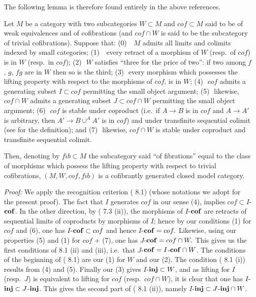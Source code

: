 The following lemma is therefore found
entirely in the above references.
\begin{lemma}
\label{dhklemme}
Let $M$ be a category with two subcategories $W\subset M$ and
$cof\subset M$
said to be of weak equivalences and of cofibrations (and $cof \cap W$
is said to be the
subcategory of trivial cofibrations). Suppose that:
\newline
(0) \,\, $M$ admits all limits and colimits indexed by small
categories;
\newline
(1) \,\, every retract of a morphism of $W$ (resp.\ of $cof$)
is in $W$ (resp.\ in $cof$);
\newline
(2)\,\, $W$ satisfies ``three for the price of two'': if two among $f$, $g$,
$fg$ are in $W$ then so is the third;
\newline
(3)\,\, every morphism which possesses the
lifting property with respect to the morphisms of
$cof$, is in $W$;
\newline
(4)\,\, $cof$ admits a generating subset $I\subset cof$ permitting
the small object argument;
\newline
(5)\,\, likewise, $cof \cap W$ admits a generating subset
$J\subset cof\cap W$
permitting the small object argument;
\newline
(6)\,\, $cof$ is stable under coproduct (i.e.\ if $A\rightarrow B$ is
in $cof$ and $A\rightarrow A'$ is arbitrary, then $A'\rightarrow B\cup ^AA'$
is in $cof$) and under transfinite sequential colimit (see
\cite{Hirschhorn} \cite{DHK} for the definition); and
\newline
(7)\,\, likewise, $cof \cap W$ is stable under coproduct and transfinite
sequential
colimit.

Then, denoting by $fib\subset M$ the subcategory said ``of fibrations''
equal to the class of morphisms which possess the
lifting property with respect to
trivial cofibrations, $(M,W,cof, fib)$ is a cofibrantly generated closed model
category.
\end{lemma}
{\em Proof:}
We apply the recognition criterion (\cite{DHK} 8.1) (whose notations we adopt
for the present proof). The fact that $I$ generates $cof$ in our
sense (4), implies $cof \subset I$-${\bf cof}$.  In the other direction, by
(\cite{DHK} 7.3 (ii)), the morphisms of  $I$-${\bf cof}$ are retracts of
sequential limits of coproducts by morphisms of $I$; hence by our
conditions (1) for $cof$ and (6), one has $I$-${\bf cof}\subset cof$ and hence
$
I$-${\bf cof}= cof.
$
Likewise, using our properties (5) and (1) for $cof$ $+$ (7), one has
$
J$-${\bf cof}= cof \cap W.
$
This gives us the first conditions of \cite{DHK} 8.1 (ii) and (iii),
i.e.\ that $J$-${\bf cof}=I$-${\bf cof}\cap W$.  The conditions of the beginning of
(\cite{DHK}
8.1) are our (1) for $W$ and our (2). The condition  (\cite{DHK} 8.1
(i)) results from
(4) and (5).  Finally our (3) gives $I$-${\bf inj} \subset W$,
and as lifting for $I$ (resp.\ $J$) is equivalent to lifting
for $cof$ (resp.\ $cof \cap W$), it is clear that one has
$I$-${\bf inj} \subset J$-${\bf inj}$. This gives the second part of
(\cite{DHK} 8.1 (ii)), namely $I$-${\bf inj} \subset J$-${\bf inj} \cap W$.
\eop

